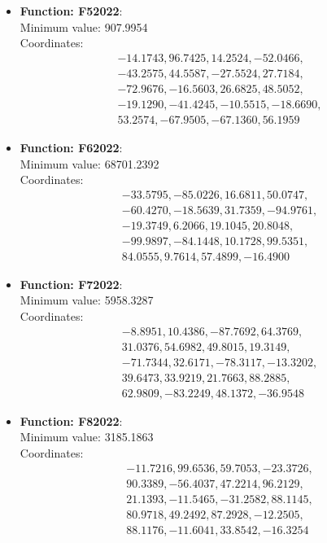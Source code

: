 \documentclass{article}
\begin{document}
\begin{itemize}
  \item \textbf{Function: F52022}: \\
    Minimum value: 907.9954 \\
    Coordinates:
    \[
      \begin{aligned}
        & -14.1743, 96.7425, 14.2524, -52.0466, \\
        & -43.2575, 44.5587, -27.5524, 27.7184, \\
        & -72.9676, -16.5603, 26.6825, 48.5052, \\
        & -19.1290, -41.4245, -10.5515, -18.6690, \\
        & 53.2574, -67.9505, -67.1360, 56.1959
      \end{aligned}
    \]

  \item \textbf{Function: F62022}: \\
    Minimum value: 68701.2392 \\
    Coordinates:
    \[
      \begin{aligned}
        & -33.5795, -85.0226, 16.6811, 50.0747, \\
        & -60.4270, -18.5639, 31.7359, -94.9761, \\
        & -19.3749, 6.2066, 19.1045, 20.8048, \\
        & -99.9897, -84.1448, 10.1728, 99.5351, \\
        & 84.0555, 9.7614, 57.4899, -16.4900
      \end{aligned}
    \]

  \item \textbf{Function: F72022}: \\
    Minimum value: 5958.3287 \\
    Coordinates:
    \[
      \begin{aligned}
        & -8.8951, 10.4386, -87.7692, 64.3769, \\
        & 31.0376, 54.6982, 49.8015, 19.3149, \\
        & -71.7344, 32.6171, -78.3117, -13.3202, \\
        & 39.6473, 33.9219, 21.7663, 88.2885, \\
        & 62.9809, -83.2249, 48.1372, -36.9548
      \end{aligned}
    \]

  \item \textbf{Function: F82022}: \\
    Minimum value: 3185.1863 \\
    Coordinates:
    \[
      \begin{aligned}
        & -11.7216, 99.6536, 59.7053, -23.3726, \\
        & 90.3389, -56.4037, 47.2214, 96.2129, \\
        & 21.1393, -11.5465, -31.2582, 88.1145, \\
        & 80.9718, 49.2492, 87.2928, -12.2505, \\
        & 88.1176, -11.6041, 33.8542, -16.3254
      \end{aligned}
    \]


\end{itemize}
\end{document}
